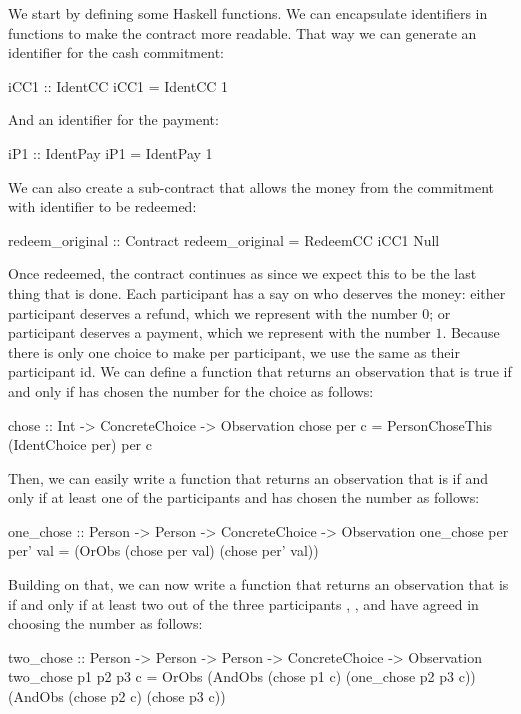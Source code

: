 \documentclass[runningheads]{llncs}
\begin{document}
We start by defining some Haskell functions. We can encapsulate identifiers in functions to make the contract more 
readable. That way we can generate an identifier for the cash commitment:

\begin{haskellcode}
iCC1 :: IdentCC
iCC1 = IdentCC 1
\end{haskellcode}
And an identifier for the payment:
\begin{haskellcode}
iP1 :: IdentPay
iP1 = IdentPay 1
\end{haskellcode}
We can also create a sub-contract that allows the money from the commitment with identifier  to 
be redeemed:
\begin{haskellcode}
redeem_original :: Contract
redeem_original = RedeemCC iCC1 Null
\end{haskellcode}
Once redeemed, the contract continues as  since we expect this to be the last thing that is done.
Each participant has a say on who deserves the money: either participant  deserves a refund, which we 
represent with the number $0$; or participant  deserves a payment, which we represent with the number 
$1$. Because there is only one choice to make per participant, we use the same  as their 
participant id. We can define a function that returns an observation that is true if and only if
 has chosen the number  for the choice  as follows:
\begin{haskellcode}
chose :: Int -> ConcreteChoice -> Observation
chose per c = PersonChoseThis (IdentChoice per) per c
\end{haskellcode}
Then, we can easily write a function that returns an observation that is  if and only if at least 
one of the participants  and  has chosen the number  as 
follows:
\begin{haskellcode}
one_chose :: Person -> Person -> ConcreteChoice -> Observation
one_chose per per' val = (OrObs (chose per val) (chose per' val)) 
\end{haskellcode}
Building on that, we can now write a function that returns an observation that is  if and only if 
at least two out of the three participants , , and  have agreed 
in choosing the number  as follows:
\begin{haskellcode}
two_chose :: Person -> Person -> Person -> ConcreteChoice -> Observation
two_chose p1 p2 p3 c = OrObs (AndObs (chose p1 c) (one_chose p2 p3 c))
                             (AndObs (chose p2 c) (chose p3 c))
\end{haskellcode}
\end{document}

